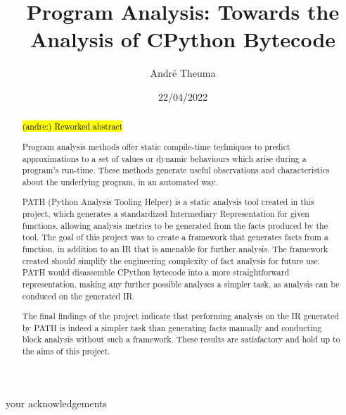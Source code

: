 \documentclass[12pt, a4paper]{report}
\DeclareRobustCommand{\andre}[1]{ {\begingroup\sethlcolor{BurntOrange}\hl{(andre:) #1}\endgroup} }
\theoremstyle{definition}
\theoremstyle{definition}%
\theoremstyle{definition}%
\theoremstyle{definition}%
\theoremstyle{definition}%
\theoremstyle{definition}%
\begin{document}
\title{Program Analysis: Towards the Analysis of CPython Bytecode}
\author{André Theuma}
\date{22/04/2022}

\frontmatter

\begin{acknowledgements}
your acknowledgements
\end{acknowledgements}
       
\begin{abstract}
    \andre {Reworked abstract}
    \par Program analysis methods offer static compile-time techniques to predict approximations to a set of values or dynamic behaviours which arise during a program's run-time.
    These methods generate useful observations and characteristics about the underlying program, in an automated way.
    \par PATH (Python Analysis Tooling Helper) is a static analysis tool created in this project, which generates a standardized Intermediary Representation for 
    given functions, allowing analysis metrics to be generated from the facts produced by the tool. The goal of this project was to create a framework that generates facts from a function, in addition to an IR that is amenable for further analysis.
    The framework created should simplify the engineering complexity of fact analysis for future use. PATH would disassemble CPython bytecode into a more 
    straightforward representation, making any further possible analyses a simpler task, as analysis can be conduced on the generated IR.
    \par The final findings of the project indicate that performing analysis on the IR generated by PATH is indeed a simpler task than generating facts manually and conducting block analysis without such a framework.
    These results are satisfactory and hold up to the aims of this project.

    \begin{figure}
        \centering
         \begin{tikzpicture}
             [
                 roundnode/.style={circle, draw=green!60, fill=green!5, very thick, minimum size=20mm},
                 rectanglenode/.style={rectangle, draw=red!60, fill=red!40, very thick, minimum size=20mm},
                 transparentbox/.style={rectangle,draw=blue!60, fill=blue!0, ultra thick, minimum width = 75mm, minimum height = 40mm},
             ]
                 

\end{tikzpicture}
\end{figure}
\end{abstract}
\end{document}
